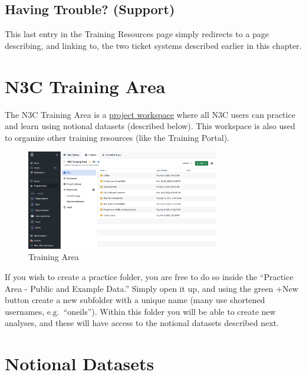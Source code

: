 \documentclass[
  letterpaper,
  DIV=11,
  numbers=noendperiod]{scrreprt}
\begin{document}
\hypertarget{sec-support-training-trouble}{%
\subsection{Having Trouble?
(Support)}\label{sec-support-training-trouble}}

This last entry in the Training Resources page simply redirects to a
page describing, and linking to, the two ticket systems described
earlier in this chapter.

\hypertarget{sec-support-area}{%
\section{N3C Training Area}\label{sec-support-area}}

The N3C Training Area is a
\protect\hyperlink{project-workspaces}{project workspace} where all N3C
users can practice and learn using notional datasets (described below).
This workspace is also used to organize other training resources (like
the Training Portal).

\begin{figure}

{\centering \includegraphics[width=0.75\textwidth,height=\textheight]{chapters/images/support/image-18-training-area.png}

}

\caption{\label{fig-support-training-area}Training Area}

\end{figure}

If you wish to create a practice folder, you are free to do so inside
the ``Practice Area - Public and Example Data.'' Simply open it up, and
using the green +New button create a new subfolder with a unique name
(many use shortened usernames, e.g.~``oneils''). Within this folder you
will be able to create new analyses, and these will have access to the
notional datasets described next.

\hypertarget{sec-support-notional}{%
\section{Notional Datasets}\label{sec-support-notional}}
\end{document}
